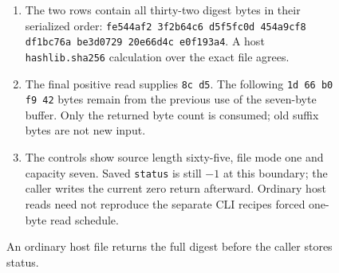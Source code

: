 \begin{figure}[htbp]
\begin{minipage}{\linewidth}
\begin{enumerate}
      \item The two rows contain all thirty-two digest bytes in their serialized order: \texttt{fe544af2 3f2b64c6 d5f5fc0d 454a9cf8 df1bc76a be3d0729 20e66d4c e0f193a4}. A host \texttt{hashlib.sha256} calculation over the exact file agrees.
      \item The final positive read supplies \texttt{8c d5}. The following \texttt{1d 66 b0 f9 42} bytes remain from the previous use of the seven-byte buffer. Only the returned byte count is consumed; old suffix bytes are not new input.
      \item The controls show source length sixty-five, file mode one and capacity seven. Saved \texttt{status} is still $-1$ at this boundary; the caller writes the current zero return afterward. Ordinary host reads need not reproduce the separate CLI recipe\textquotesingle s forced one-byte read schedule.
    \end{enumerate}
  \end{minipage}
  \caption{An ordinary host file returns the full digest before the caller stores status.}
  \label{capture:025-sha256-f04}
  \label{sha-f04}
\end{figure}
\par
